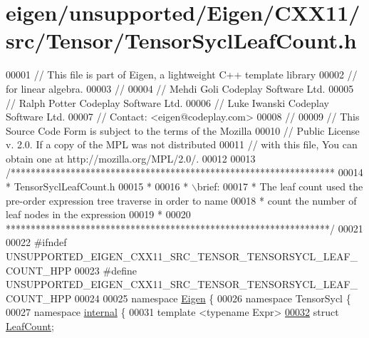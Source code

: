 \hypertarget{eigen_2unsupported_2_eigen_2_c_x_x11_2src_2_tensor_2_tensor_sycl_leaf_count_8h_source}{}\section{eigen/unsupported/\+Eigen/\+C\+X\+X11/src/\+Tensor/\+Tensor\+Sycl\+Leaf\+Count.h}
\label{eigen_2unsupported_2_eigen_2_c_x_x11_2src_2_tensor_2_tensor_sycl_leaf_count_8h_source}

\begin{DoxyCode}
00001 \textcolor{comment}{// This file is part of Eigen, a lightweight C++ template library}
00002 \textcolor{comment}{// for linear algebra.}
00003 \textcolor{comment}{//}
00004 \textcolor{comment}{// Mehdi Goli    Codeplay Software Ltd.}
00005 \textcolor{comment}{// Ralph Potter  Codeplay Software Ltd.}
00006 \textcolor{comment}{// Luke Iwanski  Codeplay Software Ltd.}
00007 \textcolor{comment}{// Contact: <eigen@codeplay.com>}
00008 \textcolor{comment}{//}
00009 \textcolor{comment}{// This Source Code Form is subject to the terms of the Mozilla}
00010 \textcolor{comment}{// Public License v. 2.0. If a copy of the MPL was not distributed}
00011 \textcolor{comment}{// with this file, You can obtain one at http://mozilla.org/MPL/2.0/.}
00012 
00013 \textcolor{comment}{/*****************************************************************}
00014 \textcolor{comment}{ * TensorSyclLeafCount.h}
00015 \textcolor{comment}{ *}
00016 \textcolor{comment}{ * \(\backslash\)brief:}
00017 \textcolor{comment}{ *  The leaf count used the pre-order expression tree traverse in order to name}
00018 \textcolor{comment}{ *  count the number of leaf nodes in the expression}
00019 \textcolor{comment}{ *}
00020 \textcolor{comment}{*****************************************************************/}
00021 
00022 \textcolor{preprocessor}{#ifndef UNSUPPORTED\_EIGEN\_CXX11\_SRC\_TENSOR\_TENSORSYCL\_LEAF\_COUNT\_HPP}
00023 \textcolor{preprocessor}{#define UNSUPPORTED\_EIGEN\_CXX11\_SRC\_TENSOR\_TENSORSYCL\_LEAF\_COUNT\_HPP}
00024 
00025 \textcolor{keyword}{namespace }\hyperlink{namespace_eigen}{Eigen} \{
00026 \textcolor{keyword}{namespace }TensorSycl \{
00027 \textcolor{keyword}{namespace }\hyperlink{namespaceinternal}{internal} \{
00031 \textcolor{keyword}{template} <\textcolor{keyword}{typename} Expr>
\hyperlink{struct_eigen_1_1_tensor_sycl_1_1internal_1_1_leaf_count}{00032} \textcolor{keyword}{struct }\hyperlink{struct_eigen_1_1_tensor_sycl_1_1internal_1_1_leaf_count}{LeafCount};

\end{DoxyCode}
